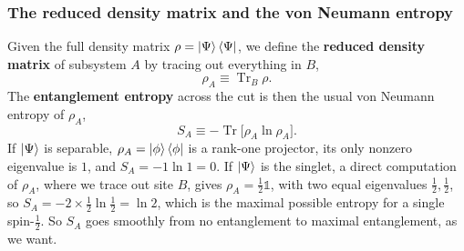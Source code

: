 \documentclass[lecture_notes.tex]{subfiles}
\begin{document}
\subsubsection{The reduced density matrix and the von Neumann entropy}
Given the full density matrix $\rho = \ket{\Psi}\bra{\Psi}$, we define the \textbf{reduced density
matrix} of subsystem $A$ by tracing out everything in $B$,
\begin{equation}
  \rho_A \equiv \operatorname{Tr}_B\rho.
\end{equation}
The \textbf{entanglement entropy} across the cut is then the usual von Neumann entropy of
$\rho_A$,
\begin{equation}
  S_A \equiv -\operatorname{Tr}\big[\rho_A \ln \rho_A\big].
  \label{eq:vonNeumann}
\end{equation}
If $\ket{\Psi}$ is separable, $\rho_A = \ket{\phi}\bra{\phi}$ is a rank-one projector, its only
nonzero eigenvalue is $1$, and $S_A = -1\ln 1 = 0$. If $\ket{\Psi}$ is the singlet, a direct
computation of $\rho_A$, where we trace out site $B$, gives $\rho_A = \tfrac12\mathbb{1}$, with
two equal eigenvalues $\tfrac12,\tfrac12$, so $S_A = -2\times\tfrac12\ln\tfrac12 = \ln 2$, which
is the maximal possible entropy for a single spin-$\tfrac12$. So $S_A$ goes smoothly from no
entanglement to maximal entanglement, as we want.
\end{document}

